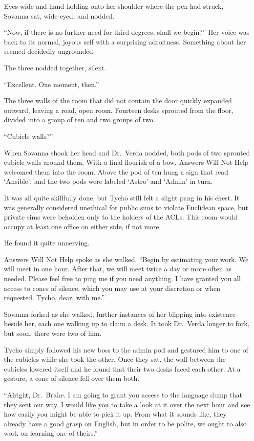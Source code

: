 Eyes wide and hand holding onto her shoulder where the pen had struck, Sovanna sat, wide-eyed, and nodded.

``Now, if there is no further need for third degrees, shall we begin?'' Her voice was back to its normal, joyous self with a surprising adroitness. Something about her seemed decidedly ungrounded.

The three nodded together, silent.

``Excellent. One moment, then.''

The three walls of the room that did not contain the door quickly expanded outward, leaving a road, open room. Fourteen desks sprouted from the floor, divided into a group of ten and two groups of two.

``Cubicle walls?''

When Sovanna shook her head and Dr.~Verda nodded, both pods of two sprouted cubicle walls around them. With a final flourish of a bow, Answers Will Not Help welcomed them into the room. Above the pod of ten hung a sign that read `Ansible', and the two pods were labeled `Astro' and `Admin' in turn.

It was all quite skillfully done, but Tycho still felt a slight pang in his chest. It was generally considered unethical for public sims to violate Euclidean space, but private sims were beholden only to the holders of the ACLs. This room would occupy at least one office on either side, if not more.

He found it quite unnerving.

Answers Will Not Help spoke as she walked. ``Begin by estimating your work. We will meet in one hour. After that, we will meet twice a day or more often as needed. Please feel free to ping me if you need anything. I have granted you all access to cones of silence, which you may use at your discretion or when requested. Tycho, dear, with me.''

Sovanna forked as she walked, further instances of her blipping into existence beside her, each one walking up to claim a desk. It took Dr.~Verda longer to fork, but soon, there were two of him.

Tycho simply followed his new boss to the admin pod and gestured him to one of the cubicles while she took the other. Once they sat, the wall between the cubicles lowered itself and he found that their two desks faced each other. At a gesture, a cone of silence fell over them both.

``Alright, Dr.~Brahe. I am going to grant you access to the language dump that they sent our way. I would like you to take a look at it over the next hour and see how easily you might be able to pick it up. From what it sounds like, they already have a good grasp on English, but in order to be polite, we ought to also work on learning one of theirs.''

